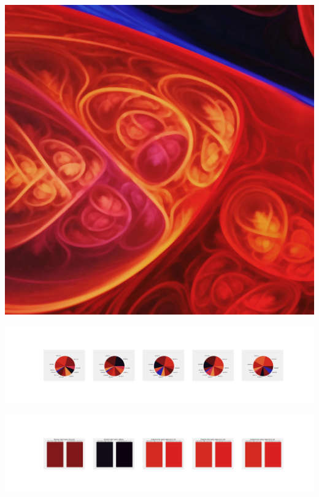 \documentclass[11pt]{article}
\begin{document}
\begin{landscape}
    \begin{center}
    \includegraphics[width=\textwidth]{./nbimg/file (177).jpg}
    \end{center}

    \begin{center}
    \includegraphics[width=250mm]{./nbimg/pie-86.jpg}
    \end{center}

    \begin{center}
    \includegraphics[width=250mm]{./nbimg/peak-86.jpg}
    \end{center}
    


\end{landscape}
\end{document}
